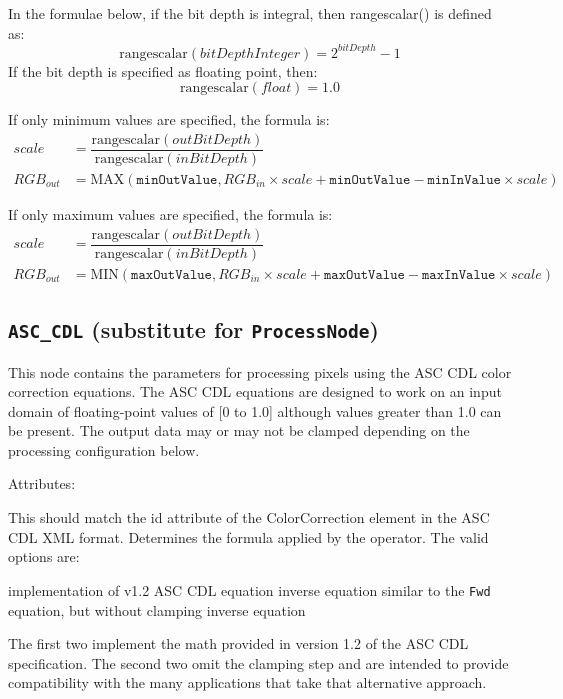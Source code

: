 In the formulae below, if the bit depth is integral, then rangescalar() is defined as:
	\begin{equation} 
	 	\mathrm{rangescalar}( bitDepthInteger ) = 2^{bitDepth} - 1
	\end{equation}
If the bit depth is specified as floating point, then:
	\begin{equation} 
		\mathrm{rangescalar}( float ) = 1.0
	\end{equation}

If only minimum values are specified, the formula is:
	\begin{align*}
		scale &= \dfrac{\mathrm{rangescalar}(outBitDepth)}{\mathrm{rangescalar}(inBitDepth)} \\
		RGB_{out} &= \mathrm{MAX}( \texttt{minOutValue}, RGB_{in} \times scale + \texttt{minOutValue} - \texttt{minInValue} \times scale)		
	\end{align*}

If only maximum values are specified, the formula is:
	\begin{align*}
		scale &= \dfrac{\mathrm{rangescalar}(outBitDepth)}{\mathrm{rangescalar}(inBitDepth)} \\
		RGB_{out} &= \mathrm{MIN}( \texttt{maxOutValue}, RGB_{in} \times scale + \texttt{maxOutValue} - \texttt{maxInValue} \times scale)		
	\end{align*}

\subsection{\texttt{ASC\_CDL} (substitute for \texttt{ProcessNode})}
This node contains the parameters for processing pixels using the ASC CDL color correction equations. The ASC CDL equations are designed to work on an input domain of floating-point values of [0 to 1.0] although values greater than 1.0 can be present. The output data may or may not be clamped depending on the processing configuration below.

Attributes:
\begin{xmlfields}
	\xmlitem[id][optional] This should match the id attribute of the ColorCorrection element in the ASC CDL XML format.
	\xmlitem[style][optional] Determines the formula applied by the operator. The valid options are:
		\begin{xmlfields}
			\xmlitemd["Fwd"] implementation of v1.2 ASC CDL equation
			\xmlitemd["Rev"] inverse equation
			\xmlitemd["FwdNoClamp"] similar to the \texttt{Fwd} equation, but without clamping
			\xmlitemd["RevNoClamp"] inverse equation
		\end{xmlfields}
		The first two implement the math provided in version 1.2 of the ASC CDL specification.  The second two omit the clamping step and are intended to provide compatibility with the many applications that take that alternative approach.
\end{xmlfields}

